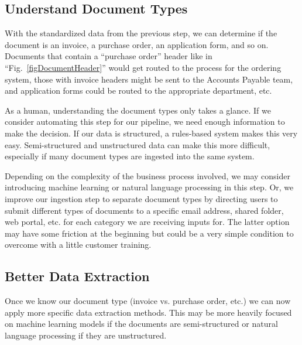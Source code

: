 \documentclass[conference]{IEEEtran}
\begin{document}
\subsection{Understand Document Types}
With the standardized data from the previous step, we can determine if the document is an invoice, a purchase order, an application form, and so on. Documents that contain a ``purchase order'' header like in ``Fig.~\ref{figDocumentHeader}'' would get routed to the process for the ordering system, those with invoice headers might be sent to the Accounts Payable team, and application forms could be routed to the appropriate department, etc.

As a human, understanding the document types only takes a glance. If we consider automating this step for our pipeline, we need enough information to make the decision. If our data is structured, a rules-based system makes this very easy. Semi-structured and unstructured data can make this more difficult, especially if many document types are ingested into the same system. 

Depending on the complexity of the business process involved, we may consider introducing machine learning or natural language processing in this step. Or, we improve our ingestion step to separate document types by directing users to submit different types of documents to a specific email address, shared folder, web portal, etc. for each category we are receiving inputs for. The latter option may have some friction at the beginning but could be a very simple condition to overcome with a little customer training.

\subsection{Better Data Extraction}
Once we know our document type (invoice vs. purchase order, etc.) we can now apply more specific data extraction methods. This may be more heavily focused on machine learning models if the documents are semi-structured or natural language processing if they are unstructured.
\end{document}
